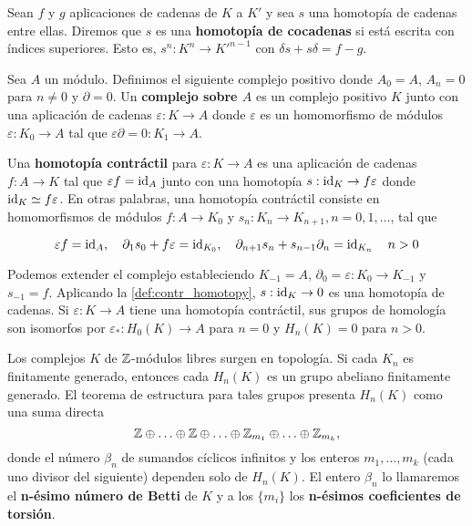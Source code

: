 
\begin{definicion}
Sean $f$ y $g$ aplicaciones de cadenas de $K$ a $K'$ y sea $s$ una homotopía de cadenas entre ellas. Diremos que $s$ es una \textbf{homotopía de cocadenas} si  está escrita con índices superiores. Esto es, \( s^n: K^n \to K'^{n-1} \) con \( \delta s + s \delta = f - g \).
\end{definicion}

\begin{definicion}
	Sea $A$ un módulo. Definimos el siguiente complejo positivo donde \( A_0 = A \), \( A_n = 0 \) para \( n \neq 0 \) y \( \partial = 0 \). Un \textbf{complejo sobre \( A \)} es un complejo positivo \( K \) junto con una aplicación de cadenas \( \varepsilon: K \to A \) donde \( \varepsilon \) es un homomorfismo de módulos \( \varepsilon: K_0 \to A \) tal que \( \varepsilon \partial = 0: K_1 \to A \).
\end{definicion}

\begin{definicion}
\label{def:contr_homotopy}
Una \textbf{homotopía contráctil} para \( \varepsilon: K \to A \) es una aplicación de cadenas \( f: A \to K \) tal que \( \varepsilon f = \operatorname{id}_A \) junto con una homotopía \( s: \operatorname{id}_K \rightarrow f \varepsilon \) donde \( \operatorname{id}_K \simeq f \varepsilon \). En otras palabras, una homotopía contráctil consiste en homomorfismos de módulos \( f: A \to K_0 \) y \( s_n: K_n \to K_{n+1}, n = 0, 1, \dots \), tal que

\[ \varepsilon f = \operatorname{id}_A, \quad \partial_{1} s_0 + f \varepsilon = \operatorname{id}_{K_0}, \quad \partial_{n+1} s_n + s_{n-1} \partial_n = \operatorname{id}_{K_n} \quad n > 0 \]
\end{definicion}

Podemos extender el complejo estableciendo \( K_{-1} = A \), \( \partial_0 = \varepsilon: K_0 \to K_{-1} \) y \( s_{-1} = f \). Aplicando la \autoref{def:contr_homotopy}, \( s: \operatorname{id}_K \rightarrow 0 \) es una homotopía de cadenas. Si \( \varepsilon: K \to A \) tiene una homotopía contráctil, sus grupos de homología son isomorfos por \( \varepsilon_*: H_0(K) \rightarrow A \) para \( n = 0 \) y \( H_n(K) = 0 \) para \( n > 0 \).

Los complejos \( K \) de $\mathbb{Z}$-módulos libres surgen en topología. Si cada \( K_n \) es finitamente generado, entonces cada \( H_n(K) \) es un grupo abeliano finitamente generado. El teorema de estructura para tales grupos presenta \( H_n(K) \) como una suma directa
\[ \mathbb{Z} \oplus \ldots \oplus \mathbb{Z} \oplus \ldots \oplus \mathbb{Z}_{m_1} \oplus \ldots \oplus \mathbb{Z}_{m_k}, \]
donde el número \( \beta_n \) de sumandos cíclicos infinitos y los enteros \( m_1, \ldots, m_k \) (cada uno divisor del siguiente) dependen solo de \( H_n(K) \). El entero \( \beta_n \) lo llamaremos el \textbf{n-ésimo número de Betti} de \( K \) y a los \( \{m_i\} \) los \textbf{n-ésimos coeficientes de torsión}.

